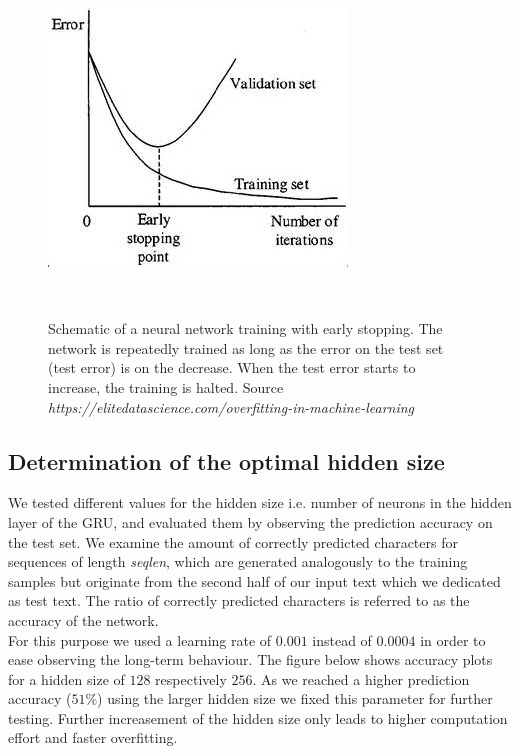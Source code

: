\documentclass[11pt,a4paper,bibliography=totocnumbered,listof=totocnumbered]{scrartcl}
\begin{document}
\begin{figure}[H]
   \begin{minipage}{\textwidth}
     \centering
     \includegraphics[width=.4\textwidth]{early-stopping-graphic}
     \caption{Schematic of a neural network training with early stopping. The network is repeatedly trained as long as the error on the test set (test error) is on the decrease. When the test error starts to increase, the training is halted. Source \textit{https://elitedatascience.com/overfitting-in-machine-learning}}
     \label{fig:stop}
   \end{minipage}\\[1em]   
\end{figure}

\subsection{Determination of the optimal hidden size}
We tested different values for the hidden size i.e. number of neurons in the hidden layer of the GRU, and evaluated them by observing the prediction accuracy on the test set. 
We examine the amount of correctly predicted characters for sequences of length \textit{seqlen}, which are generated analogously to the training samples but originate from the second half of our input text which we dedicated as test text. The ratio of correctly predicted characters is referred to as the accuracy of the network. \\
For this purpose we used a learning rate of $0.001$ instead of $0.0004$ in order to ease observing the long-term behaviour. The figure below shows accuracy plots for a hidden size of $128$ respectively $256$. As we reached a higher prediction accuracy ($51 \%$) using the larger hidden size we fixed this parameter for further testing.  Further increasement of the hidden size only leads to higher computation effort and faster overfitting.
\end{document}
